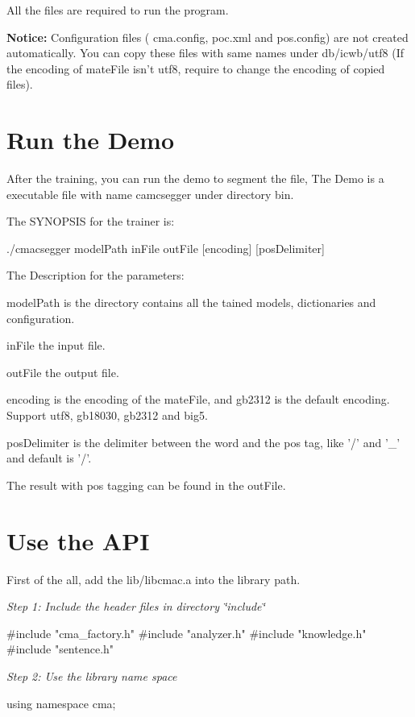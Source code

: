 All the files are required to run the program.\par


{\bfseries Notice:} Configuration files ( cma.config, poc.xml and pos.config) are not created automatically. You can copy these files with same names under db/icwb/utf8 (If the encoding of mateFile isn't utf8, require to change the encoding of copied files).\section{Run the Demo}\label{index_rundemo}
After the training, you can run the demo to segment the file, The Demo is a executable file with name camcsegger under directory bin.

The SYNOPSIS for the trainer is: \par
 ./cmacsegger modelPath inFile outFile [encoding] [posDelimiter] \par


\par
The Description for the parameters: 
\begin{DoxyItemize}
\item modelPath is the directory contains all the tained models, dictionaries and configuration.  
\item inFile the input file. 
\item outFile the output file. 
\item encoding is the encoding of the mateFile, and gb2312 is the default encoding. Support utf8, gb18030, gb2312 and big5. 
\item posDelimiter is the delimiter between the word and the pos tag, like '/' and '\_\-' and default is '/'. 
\end{DoxyItemize}

The result with pos tagging can be found in the outFile.\section{Use the API}\label{index_useapi}
First of the all, add the lib/libcmac.a into the library path.

{\itshape Step 1: Include the header files in directory \char`\"{}include\char`\"{}\/} 
\begin{DoxyCode}
#include "cma_factory.h"
#include "analyzer.h"
#include "knowledge.h"
#include "sentence.h"
\end{DoxyCode}


{\itshape Step 2: Use the library name space\/} 
\begin{DoxyCode}
using namespace cma;
\end{DoxyCode}


